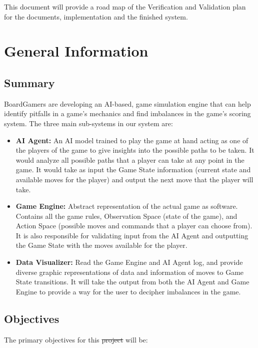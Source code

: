 \documentclass[12pt, titlepage]{article}
\providecommand{\DIFaddtex}[1]{{\protect\color{blue}\uwave{#1}}} %
\providecommand{\DIFdeltex}[1]{{\protect\color{red}\sout{#1}}}                      %
\providecommand{\DIFaddbegin}{} %
\providecommand{\DIFaddend}{} %
\providecommand{\DIFdelbegin}{} %
\providecommand{\DIFdelend}{} %
\providecommand{\DIFadd}[1]{\texorpdfstring{\DIFaddtex{#1}}{#1}} %
\providecommand{\DIFdel}[1]{\texorpdfstring{\DIFdeltex{#1}}{}} %
\newcommand{\DIFscaledelfig}{0.5}
\newlength{\DIFdelgraphicswidth} %
\newlength{\DIFdelgraphicsheight} %
\newcommand{\DIFaddincludegraphics}[2][]{{\color{blue}\fbox{\DIFOincludegraphics[#1]{#2}}}} %
\newcommand{\DIFdelincludegraphics}[2][]{%
\sbox{\DIFdelgraphicsbox}{\DIFOincludegraphics[#1]{#2}}%
\settoboxwidth{\DIFdelgraphicswidth}{\DIFdelgraphicsbox} %
\settoboxtotalheight{\DIFdelgraphicsheight}{\DIFdelgraphicsbox} %
\scalebox{\DIFscaledelfig}{%
\parbox[b]{\DIFdelgraphicswidth}{\usebox{\DIFdelgraphicsbox}\\[-\baselineskip] \rule{\DIFdelgraphicswidth}{0em}}\llap{\resizebox{\DIFdelgraphicswidth}{\DIFdelgraphicsheight}{%
\setlength{\unitlength}{\DIFdelgraphicswidth}%
\begin{picture}(1,1)%
\thicklines\linethickness{2pt} %
{\color[rgb]{1,0,0}\put(0,0){\framebox(1,1){}}}%
{\color[rgb]{1,0,0}\put(0,0){\line( 1,1){1}}}%
{\color[rgb]{1,0,0}\put(0,1){\line(1,-1){1}}}%
\end{picture}%
}\hspace*{3pt}}} %
} %
\DeclareRobustCommand{\DIFaddbegin}{\DIFOaddbegin \let\includegraphics\DIFaddincludegraphics} %
\DeclareRobustCommand{\DIFaddend}{\DIFOaddend \let\includegraphics\DIFOincludegraphics} %
\DeclareRobustCommand{\DIFdelbegin}{\DIFOdelbegin \let\includegraphics\DIFdelincludegraphics} %
\DeclareRobustCommand{\DIFdelend}{\DIFOaddend \let\includegraphics\DIFOincludegraphics} %
\begin{document}
This document will provide a road map of the Verification and Validation plan for the documents, implementation and the finished system.

\section{General Information}

\subsection{Summary}
BoardGamers are developing an AI-based, game simulation engine that can help identify pitfalls in a game's mechanics and find imbalances in the game's scoring system. The three main sub-systems in our system are:
\begin{itemize}
    \item \textbf{AI Agent:} An AI model trained to play the game at hand acting as one of the players of the game to give insights into the possible paths to be taken. It would analyze all possible paths that a player can take at any point in the game. It would take as input the Game State information (current state and available moves for the player) and output the next move that the player will take. 

    \item \textbf{Game Engine:} Abstract representation of the actual game as software. Contains all the game rules, Observation Space (state of the game), and Action Space (possible moves and commands that a player can choose from). It is also responsible for validating input from the AI Agent and outputting the Game State with the moves available for the player. 

    \item \textbf{Data Visualizer:} Read the Game Engine and AI Agent log, and provide diverse graphic representations of data and information of moves to Game State transitions. It will take the output from both the AI Agent and Game Engine to provide a way for the user to decipher imbalances in the game.

\end{itemize}

\subsection{Objectives}

The primary objectives for this \DIFdelbegin \DIFdel{project }\DIFdelend \DIFaddbegin \DIFadd{document }\DIFaddend will be:
\end{document}
